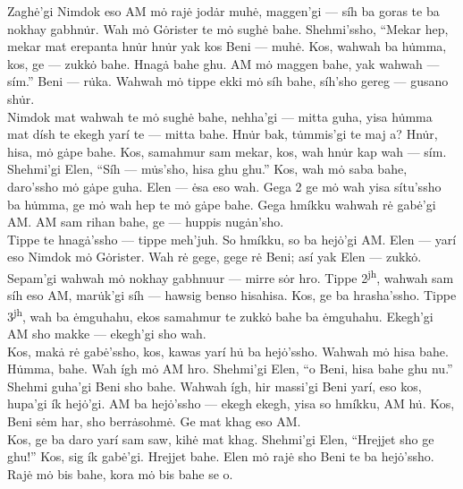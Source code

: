 \documentclass{article}[10pt]
\begin{document}
Zagh\.{e}'gi Nimdok eso AM m\.{o} raj\.{e} jod\.{a}r muh\.{e}, maggen'gi --- s\'{i}h ba goras te ba nokhay gabhn\.{u}r. Wah m\.{o} G\.{o}rister te m\.{o} sugh\.{e} bahe. Shehmi'ssho, ``Mekar hep, mekar mat erepanta hn\.{u}r hn\.{u}r yak kos Beni --- muh\.{e}. Kos, wahwah ba h\.{u}mma, kos, ge --- zukk\.{o} bahe. Hnag\.{a} bahe ghu. AM m\.{o} maggen bahe, yak wahwah --- s\'{i}m.'' Beni --- r\.{u}ka. Wahwah m\.{o} tippe ekki m\.{o} s\'{i}h bahe, s\'{i}h'sho gereg --- gusano sh\.{u}r.\\

Nimdok mat wahwah te m\.{o} sugh\.{e} bahe, nehha'gi --- mitta guha, yisa h\.{u}mma mat d\'{i}sh te ekegh yar\'{i} te --- mitta bahe. Hn\.{u}r bak, t\.{u}mmis'gi te maj a? Hn\.{u}r, hisa, m\.{o} g\.{a}pe bahe. Kos, samahmur sam mekar, kos, wah hn\.{u}r kap wah --- s\'{i}m. Shehmi'gi Elen, ``S\'{i}h --- m\.{u}s'sho, hisa ghu ghu.'' Kos, wah m\.{o} saba bahe, daro'ssho m\.{o} g\.{a}pe guha. Elen --- \.{e}sa eso wah. Gega 2 ge m\.{o} wah yisa s\'{i}tu'ssho ba h\.{u}mma, ge m\.{o} wah hep te m\.{o} g\.{a}pe bahe. Gega hm\'{i}kku wahwah r\.{e} gab\.{e}'gi AM. AM sam rihan bahe, ge --- huppis nug\.{a}n'sho.\\

Tippe te hnag\.{a}'ssho --- tippe meh'juh. So hm\'{i}kku, so ba hej\.{o}'gi AM. Elen --- yar\'{i} eso Nimdok m\.{o} G\.{o}rister. Wah r\.{e} gege, gege r\.{e} Beni; as\'{i} yak Elen --- zukk\.{o}. Sepam'gi wahwah m\.{o} nokhay gabhnuur --- mirre s\.{o}r hro. Tippe 2\textsuperscript{jh}, wahwah sam s\'{i}h eso AM, mar\.{u}k'gi s\'{i}h --- hawsig benso hisahisa. Kos, ge ba hrasha'ssho. Tippe 3\textsuperscript{jh}, wah ba \.{e}mguhahu, ekos samahmur te zukk\.{o} bahe ba \.{e}mguhahu. Ekegh'gi AM sho makke --- ekegh'gi sho wah.\\

Kos, mak\.{a} r\.{e} gab\.{e}'ssho, kos, kawas yar\'{i} h\.{u} ba hej\.{o}'ssho. Wahwah m\.{o} hisa bahe. H\.{u}mma, bahe. Wah \'{i}gh m\.{o} AM hro. Shehmi'gi Elen, ``o Beni, hisa bahe ghu nu.'' Shehmi guha'gi Beni sho bahe. Wahwah \'{i}gh, hir massi'gi Beni yar\'{i}, eso kos, hupa'gi \'{i}k hej\.{o}'gi. AM ba hej\.{o}'ssho --- ekegh ekegh, yisa so hm\'{i}kku, AM  h\.{u}. Kos, Beni s\.{e}m har, sho berr\.{a}sohm\.{e}. Ge mat khag eso AM.\\

Kos, ge ba daro yar\'{i} sam saw, kih\.{e} mat khag. Shehmi'gi Elen, ``Hrejjet sho ge ghu!'' Kos, sig \'{i}k gab\.{e}'gi. Hrejjet bahe. Elen m\.{o} raj\.{e} sho Beni te ba hej\.{o}'ssho. Raj\.{e} m\.{o} bis bahe, kora m\.{o} bis bahe se o.\\
\end{document}
